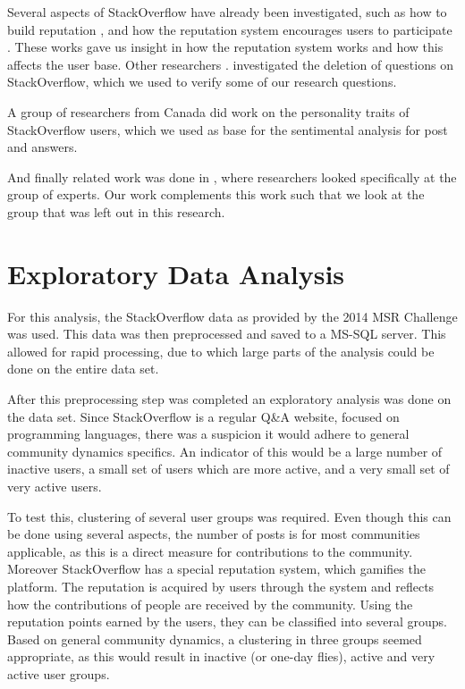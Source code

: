 \documentclass[conference]{IEEEtran}
\begin{document}
Several aspects of StackOverflow have already been investigated, such as how to
build reputation \cite{bosu2013building}, and how the reputation system
encourages users to participate \cite{movshovitz2013analysis}. These works gave
us insight in how the reputation system works and how this affects the user
base. Other researchers \cite{correa2014chaff}. investigated the deletion of
questions on StackOverflow, which we used to verify some of our research
questions. 

A group of researchers from Canada \cite{bazelli2013personality} did work on
the personality traits of StackOverflow users, which we used as base for the
sentimental analysis for post and answers.

And finally related work was done in \cite{yang2014sparrows}, where researchers
looked specifically at the group of experts. Our work complements this work
such that we look at the group that was left out in this research.


\section{Exploratory Data Analysis}

For this analysis, the StackOverflow data as provided by the 2014 MSR Challenge
was used. This data was then preprocessed and saved to a MS-SQL server. This
allowed for rapid processing, due to which large parts of the analysis could be
done on the entire data set.

After this preprocessing step was completed an exploratory analysis was done on
the data set. Since StackOverflow is a regular Q\&A website, focused on
programming languages, there was a suspicion it would adhere to general
community dynamics specifics. An indicator of this would be a large number of
inactive users, a small set of users which are more active, and a very small
set of very active users.

To test this, clustering of several user groups was required. Even though  this
can be done using several aspects, the number of posts is for most communities
applicable, as this is a direct measure for contributions to the community.
Moreover StackOverflow has a special reputation system, which gamifies the
platform. The reputation is acquired by users through the system and reflects
how the contributions of people are received by the community. Using the
reputation points earned by the users, they can be classified into several
groups. Based  on general community dynamics, a clustering in three groups
seemed appropriate, as this would result in inactive (or one-day flies), active
and very active user groups.
\end{document}
